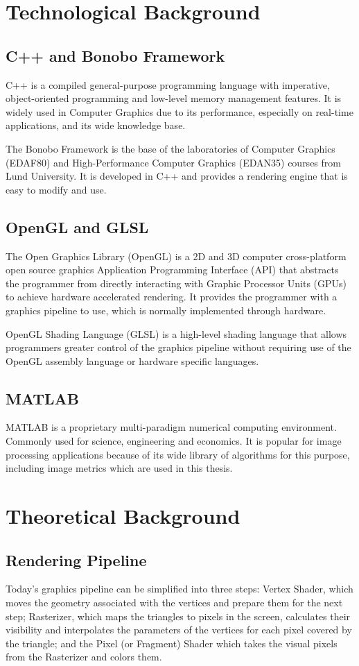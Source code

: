 \documentclass{cslthse-msc}
\begin{document}
\chapter{Technological Background}
\section{C++ and Bonobo Framework}
C++ is a compiled general-purpose programming language with imperative, object-oriented programming and low-level memory management features. It is widely used in Computer Graphics due to its performance, especially on real-time applications, and its wide knowledge base.

The Bonobo Framework is the base of the laboratories of Computer Graphics (EDAF80) and High-Performance Computer Graphics (EDAN35) courses from Lund University. It is developed in C++ and provides a rendering engine that is easy to modify and use.
\section{OpenGL and GLSL}
The Open Graphics Library (OpenGL) is a 2D and 3D computer cross-platform open source graphics Application Programming Interface (API) that abstracts the programmer from directly interacting with Graphic Processor Units (GPUs) to achieve hardware accelerated rendering. It provides the programmer with a graphics pipeline to use, which is normally implemented through hardware.

OpenGL Shading Language (GLSL) is a high-level shading language that allows programmers greater  control of the graphics pipeline without requiring use of the OpenGL assembly language or hardware specific languages. 
\section{MATLAB}
MATLAB is a proprietary multi-paradigm numerical computing environment. Commonly used for science, engineering and economics. It is popular for image processing applications because of its wide library of algorithms for this purpose, including image metrics which are used in this thesis.   

\chapter{Theoretical Background}
\section{Rendering Pipeline}
Today’s graphics pipeline can be simplified into three steps: Vertex Shader, which moves the geometry associated with the vertices and prepare them for the next step; Rasterizer, which maps the triangles to pixels in the screen, calculates their visibility and interpolates the parameters of the vertices for each pixel covered by the triangle; and the Pixel (or Fragment) Shader which takes the visual pixels from the Rasterizer and colors them.
\end{document}

